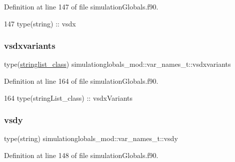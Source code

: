 Definition at line 147 of file simulation\+Globals.\+f90.


\begin{DoxyCode}
147         \textcolor{keywordtype}{type}(string) :: vsdx
\end{DoxyCode}
\mbox{\label{structsimulationglobals__mod_1_1var__names__t_aac8b63164fa32dde4b676bc49b9ec7f8}} 
\subsubsection{\texorpdfstring{vsdxvariants}{vsdxvariants}}
{\footnotesize\ttfamily type(\mbox{\hyperlink{structsimulationglobals__mod_1_1stringlist__class}{stringlist\+\_\+class}}) simulationglobals\+\_\+mod\+::var\+\_\+names\+\_\+t\+::vsdxvariants\hspace{0.3cm}{\ttfamily [private]}}



Definition at line 164 of file simulation\+Globals.\+f90.


\begin{DoxyCode}
164         \textcolor{keywordtype}{type}(stringList\_class) :: vsdxVariants
\end{DoxyCode}
\mbox{\label{structsimulationglobals__mod_1_1var__names__t_a4f4344b96df0c845db47515a5848f9b2}} 
\subsubsection{\texorpdfstring{vsdy}{vsdy}}
{\footnotesize\ttfamily type(string) simulationglobals\+\_\+mod\+::var\+\_\+names\+\_\+t\+::vsdy\hspace{0.3cm}{\ttfamily [private]}}



Definition at line 148 of file simulation\+Globals.\+f90.


